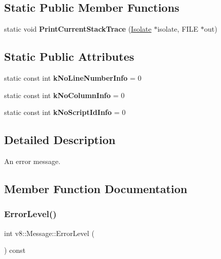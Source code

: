 \subsection*{Static Public Member Functions}
\begin{DoxyCompactItemize}
\item 
\mbox{\label{classv8_1_1Message_ae5d67d123c5611e6bc36824c938cbfa5}} 
static void {\bfseries Print\+Current\+Stack\+Trace} (\mbox{\hyperlink{classv8_1_1Isolate}{Isolate}} $\ast$isolate, F\+I\+LE $\ast$out)
\end{DoxyCompactItemize}
\subsection*{Static Public Attributes}
\begin{DoxyCompactItemize}
\item 
\mbox{\label{classv8_1_1Message_a35649a6c0c813ba82c9886a2b17da124}} 
static const int {\bfseries k\+No\+Line\+Number\+Info} = 0
\item 
\mbox{\label{classv8_1_1Message_a8cb643dbf408b0fd2526b23a8202c4a6}} 
static const int {\bfseries k\+No\+Column\+Info} = 0
\item 
\mbox{\label{classv8_1_1Message_a5aac643173466e88544cb1daa74553d6}} 
static const int {\bfseries k\+No\+Script\+Id\+Info} = 0
\end{DoxyCompactItemize}


\subsection{Detailed Description}
An error message. 

\subsection{Member Function Documentation}
\mbox{\label{classv8_1_1Message_a91bb679f695d82c2c2228645ca4497c6}} 
\subsubsection{\texorpdfstring{Error\+Level()}{ErrorLevel()}}
{\footnotesize\ttfamily int v8\+::\+Message\+::\+Error\+Level (\begin{DoxyParamCaption}{ }\end{DoxyParamCaption}) const}

